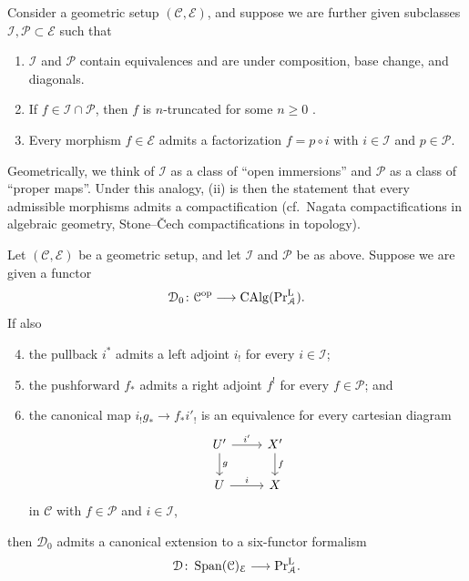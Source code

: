 Consider a geometric setup $(\mathcal C, \mathcal E)$, and suppose we are further given subclasses $\mathcal I, \mathcal P \subset \mathcal E$ such that
\begin{enumerate}[label=(\roman*)]
\item $\mathcal I$ and $\mathcal P$ contain equivalences and are under composition, base change, and diagonals.
\item If $f\in\mathcal I\cap\mathcal P$, then $f$ is $n$-truncated for some $n\geq 0$ \cite[Definition 5.5.6.8]{Lurie2009}. 
\item Every morphism $f \in \mathcal E$ admits a factorization $f = p \circ i$ with $i \in \mathcal I$ and $p \in \mathcal P$.
\end{enumerate}
Geometrically, we think of $\mathcal I$ as a class of ``open immersions'' and $\mathcal P$ as a class of ``proper maps''. Under this analogy, (ii) is then the statement that every admissible morphisms admits a compactification (cf.~Nagata compactifications in algebraic geometry, Stone--\v{C}ech compactifications in topology).
\begin{thm}\label{thm:construction-IP}
  Let $(\mathcal C, \mathcal E)$ be a geometric setup, and let $\mathcal I$ and $\mathcal P$ be as above. Suppose we are given a functor
  \[
    \mathcal D_0\colon\mathcal C^{\mathrm{op}}\longrightarrow\operatorname{CAlg} (\mathrm{Pr}^{\mathrm{L}}_{\mathcal{A}}).
  \]
  If also
  \begin{enumerate}[label=(\roman*)]
    \setcounter{enumi}{3}
  \item the pullback $i^*$ admits a left adjoint $i_!$ for every $i\in\mathcal I$;
  \item the pushforward $f_*$ admits a right adjoint $f^!$ for every $f \in \mathcal P$; and
  \item the canonical map $i_!g_*\to f_*i'_!$ is an equivalence for every cartesian diagram
    \[
      \begin{tikzcd}
        U'\arrow[r,"i'"]\arrow[d,"g"]
        & X'\arrow[d,"f"] \\
        U\arrow[r,"i"]
        & X
      \end{tikzcd}
    \]
    in $\mathcal C$ with $f\in\mathcal P$ and $i\in\mathcal I$,
  \end{enumerate}
  then $\mathcal D_0$ admits a canonical extension to a six-functor formalism
  \[
    \mathcal D\colon\operatorname{\mathrm{Span}}({\mathcal C})_{\mathcal E}\longrightarrow \mathrm{Pr}^{\mathrm{L}}_{\mathcal{A}}.
  \]
\end{thm}

